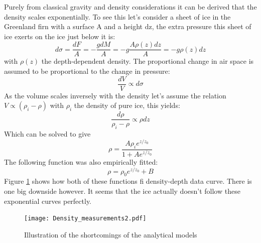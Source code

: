 Purely from classical gravity and density considerations it can be derived that
the density scales exponentially. To see this let's consider a sheet of ice in
the Greenland firn with a surface A and a height dz, the extra pressure this
sheet of ice exerts on the ice just below it is:
\begin{equation}
	d\sigma = \frac{dF}{A} = -\frac{gdM}{A} = -g\frac{A\rho(z)dz}{A} = -g\rho(z)dz
\end{equation}
with $\rho(z)$ the depth-dependent density. The proportional change in air
space is assumed to be proportional to the change in
pressure\cite{herron_langway_1980}:
\begin{equation}
	\frac{dV}{V} \propto d\sigma
\end{equation}
As the volume scales inversely with the density let's assume the relation $V \propto (\rho_i - \rho)$ with
$\rho_i$ the density of pure ice, this yields:
\begin{equation}
	\frac{d\rho}{\rho_i - \rho} \propto \rho dz
\end{equation}
Which can be solved to give
\begin{equation}
	\rho = \frac{A\rho_i e^{z/z_0}}{1 + Ae^{z/z_0}}
\end{equation}
The following function was also empirically fitted:
\begin{equation}
	\label{eqn:myderiexp}
	\rho = \rho_0 e^{z/z_0} + B
\end{equation}
Figure \ref{fig:DensityMeasurements} shows how both of these
functions fi density-depth data\cite{alley_koci_1988}\cite{hawley_morris_mcconnell_2008} curve.  
There is one big downside however.
It seems that the ice actually doesn't follow these exponential
curves perfectly.
\begin{figure}
  \centering
	\texttt{[image: Density\_measurements2.pdf]}
	\caption{Illustration of the shortcomings of the analytical models}
	\label{fig:DensityMeasurements}
\end{figure}

